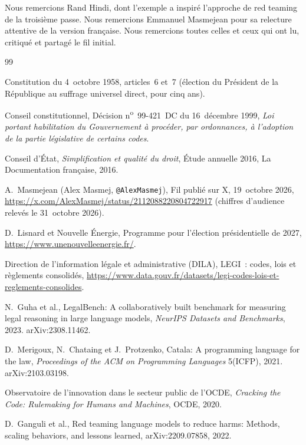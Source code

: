 \documentclass[11pt,a4paper]{article}
\begin{document}
Nous remercions Rand Hindi, dont l'exemple a inspiré l'approche de \og red teaming \fg{} de la troisième passe. Nous remercions Emmanuel Masmejean pour sa relecture attentive de la version française. Nous remercions toutes celles et ceux qui ont lu, critiqué et partagé le fil initial.

\begin{thebibliography}{99}

Constitution du 4~octobre 1958, articles~6 et~7 (élection du Président de la République au suffrage universel direct, pour cinq ans).

Conseil constitutionnel,
Décision n\textsuperscript{o}~99-421~DC du 16~décembre 1999, \emph{Loi portant habilitation du Gouvernement à procéder, par ordonnances, à l'adoption de la partie législative de certains codes}.

Conseil d'État,
\emph{Simplification et qualité du droit}, Étude annuelle 2016, La Documentation française, 2016.

A.~Masmejean (Alex Masmej, \texttt{@AlexMasmej}),
Fil publié sur X, 19~octobre 2026,
\url{https://x.com/AlexMasmej/status/2112088220804722917} (chiffres d'audience relevés le 31~octobre 2026).

D.~Lisnard et Nouvelle Énergie,
Programme pour l'élection présidentielle de 2027,
\url{https://www.unenouvelleenergie.fr/}.

Direction de l'information légale et administrative (DILA),
LEGI~: codes, lois et règlements consolidés,
\url{https://www.data.gouv.fr/datasets/legi-codes-lois-et-reglements-consolides}.

N.~Guha et al.,
LegalBench: A collaboratively built benchmark for measuring legal reasoning in large language models,
\emph{NeurIPS Datasets and Benchmarks}, 2023. arXiv:2308.11462.

D.~Merigoux, N.~Chataing et J.~Protzenko,
Catala: A programming language for the law,
\emph{Proceedings of the ACM on Programming Languages} 5(ICFP), 2021. arXiv:2103.03198.

Observatoire de l'innovation dans le secteur public de l'OCDE,
\emph{Cracking the Code: Rulemaking for Humans and Machines}, OCDE, 2020.

D.~Ganguli et al.,
Red teaming language models to reduce harms: Methods, scaling behaviors, and lessons learned,
arXiv:2209.07858, 2022.

\end{thebibliography}
\end{document}

